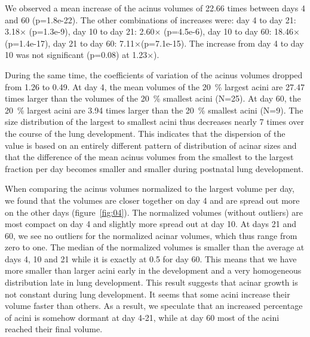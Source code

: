 \documentclass[
  american,
]{article}
\begin{document}
We observed a mean increase of the acinus volumes of 22.66 times between days 4 and 60 (p=1.8e-22).
The other combinations of increases were: day 4 to day 21: 3.18× (p=1.3e-9), day 10 to day 21: 2.60× (p=4.5e-6), day 10 to day 60: 18.46× (p=1.4e-17), day 21 to day 60: 7.11×(p=7.1e-15).
The increase from day 4 to day 10 was not significant (p=0.08) at 1.23×).

During the same time, the coefficients of variation of the acinus volumes dropped from 1.26 to 0.49.
At day 4, the mean volumes of the 20~\% largest acini are 27.47 times larger than the volumes of the 20~\% smallest acini (N=25).
At day 60, the 20~\% largest acini are 3.94 times larger than the 20~\% smallest acini (N=9).
The size distribution of the largest to smallest acini thus decreases nearly 7 times over the course of the lung development.
This indicates that the dispersion of the value is based on an entirely different pattern of distribution of acinar sizes and that the difference of the mean acinus volumes from the smallest to the largest fraction per day becomes smaller and smaller during postnatal lung development.

When comparing the acinus volumes normalized to the largest volume per day, we found that the volumes are closer together on day 4 and are spread out more on the other days (figure~\ref{fig:04}).
The normalized volumes (without outliers) are most compact on day 4 and slightly more spread out at day 10.
At days 21 and 60, we see no outliers for the normalized acinar volumes, which thus range from zero to one.
The median of the normalized volumes is smaller than the average at days 4, 10 and 21 while it is exactly at 0.5 for day 60.
This means that we have more smaller than larger acini early in the development and a very homogeneous distribution late in lung development.
This result suggests that acinar growth is not constant during lung development.
It seems that some acini increase their volume faster than others.
As a result, we speculate that an increased percentage of acini is somehow dormant at day 4‐21, while at day 60 most of the acini reached their final volume.
\end{document}
